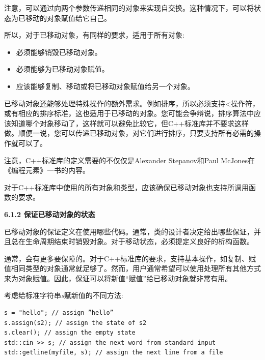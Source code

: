 注意，可以通过向两个参数传递相同的对象来实现自交换。这种情况下，可以将状态为已移动的对象赋值给它自己。\par

所以，对于已移动对象，有同样的要求，适用于所有对象:\par

\begin{itemize}
	\item 必须能够销毁已移动对象。
	\item 必须能够为已移动对象赋值。
	\item 应该能够复制、移动或将已移动对象赋值给另一个对象。
\end{itemize}

已移动对象还能够处理特殊操作的额外需求。例如排序，所以必须支持<操作符，或有相应的排序标准，这也适用于已移动的对象。您可能会争辩说，排序算法中应该知道哪个对象移动了，这样就可以避免比较它，但C++标准库并不要求这样做。顺便一说，您可以传递已移动对象，对它们进行排序，只要支持所有必需的操作就可以了。\par

注意，C++标准库的定义需要的不仅仅是Alexander Stepanov和Paul McJones在《编程元素》一书的内容。\par

对于C++标准库中使用的所有对象和类型，应该确保已移动对象也支持所调用函数的要求。\par

\hspace*{\fill} \par %
\textbf{6.1.2 保证已移动对象的状态}

已移动对象的保证定义在使用哪些代码。通常，类的设计者决定给出哪些保证，并且总在生命周期结束时销毁对象。对于移动状态，必须提定义良好的析构函数。\par

通常，会有更多要保障的。对于C++标准库的要求，支持基本操作，如复制、赋值相同类型的对象通常就足够了。然而，用户通常希望可以使用处理所有其他方式来为对象赋值。因此，保证可以将新值“赋值”给已移动对象就非常有用。\par

考虑给标准字符串\textit{s}赋新值的不同方法:\par

\begin{lstlisting}[caption={}]
s = "hello"; // assign ”hello”
s.assign(s2); // assign the state of s2
s.clear(); // assign the empty state
std::cin >> s; // assign the next word from standard input
std::getline(myfile, s); // assign the next line from a file
\end{lstlisting}


